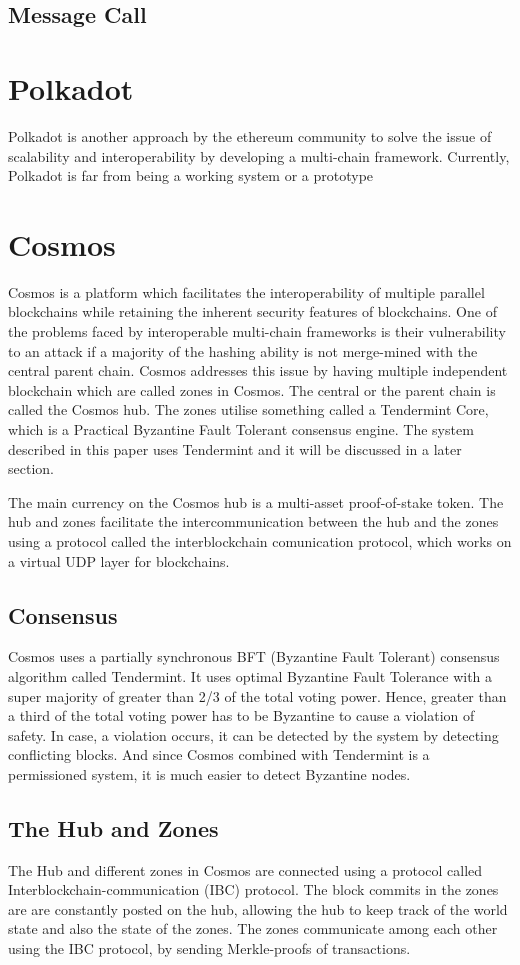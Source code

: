\documentclass[a4paper,twoside,phd]{BYUPhys}
\begin{document}
\subsection{Message Call}
\section{Polkadot}
Polkadot is another approach by the ethereum community to solve the issue of scalability and interoperability by developing a multi-chain framework. Currently, Polkadot is far from being a working system or a prototype 
\section{Cosmos}
Cosmos is a platform which facilitates the interoperability of multiple parallel blockchains while retaining the inherent security features of blockchains. One of the problems faced by interoperable multi-chain frameworks is their vulnerability to an attack if a majority of the hashing ability is not merge-mined with the central parent chain. Cosmos addresses this issue by having multiple independent blockchain which are called zones in Cosmos. The central or the parent chain is called the Cosmos hub. The zones utilise something called a Tendermint Core, which is a Practical Byzantine Fault Tolerant consensus engine. The system described in this paper uses Tendermint and it will be discussed in a later section.

The main currency on the Cosmos hub is a multi-asset proof-of-stake token. The hub and zones facilitate the intercommunication between the hub and the zones using a protocol called the interblockchain comunication protocol, which works on a virtual UDP layer for blockchains.

\subsection{Consensus}
Cosmos uses a partially synchronous BFT (Byzantine Fault Tolerant) consensus algorithm called Tendermint. It uses optimal Byzantine Fault Tolerance with a super majority of greater than 2/3 of the total voting power. Hence, greater than a third of the total voting power has to be Byzantine to cause a violation of safety. In case, a violation occurs, it can be detected by the system by detecting conflicting blocks. And since Cosmos combined with Tendermint is a permissioned system, it is much easier to detect Byzantine nodes.

\subsection{The Hub and Zones}
The Hub and different zones in Cosmos are connected using a protocol called Interblockchain-communication (IBC) protocol. The block commits in the zones are are constantly posted on the hub, allowing the hub to keep track of the world state and also the state of the zones. The zones communicate among each other using the IBC protocol, by sending Merkle-proofs of transactions. 
\end{document}
